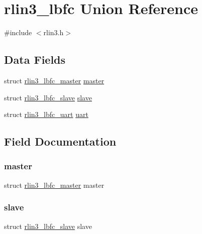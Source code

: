 \hypertarget{unionrlin3__lbfc}{}\section{rlin3\+\_\+lbfc Union Reference}
\label{unionrlin3__lbfc}


{\ttfamily \#include $<$rlin3.\+h$>$}

\subsection*{Data Fields}
\begin{DoxyCompactItemize}
\item 
struct \mbox{\hyperlink{structrlin3__lbfc__master}{rlin3\+\_\+lbfc\+\_\+master}} \mbox{\hyperlink{unionrlin3__lbfc_a350471fb0608bb7e538d001cd3d2c72a}{master}}
\item 
struct \mbox{\hyperlink{structrlin3__lbfc__slave}{rlin3\+\_\+lbfc\+\_\+slave}} \mbox{\hyperlink{unionrlin3__lbfc_a7c6a5e576b568ed606b3997db6e898f5}{slave}}
\item 
struct \mbox{\hyperlink{structrlin3__lbfc__uart}{rlin3\+\_\+lbfc\+\_\+uart}} \mbox{\hyperlink{unionrlin3__lbfc_aded53e20b3095d4feec0e4ed6378fd91}{uart}}
\end{DoxyCompactItemize}


\subsection{Field Documentation}
\mbox{\label{unionrlin3__lbfc_a350471fb0608bb7e538d001cd3d2c72a}} 
\subsubsection{\texorpdfstring{master}{master}}
{\footnotesize\ttfamily struct \mbox{\hyperlink{structrlin3__lbfc__master}{rlin3\+\_\+lbfc\+\_\+master}} master}

\mbox{\label{unionrlin3__lbfc_a7c6a5e576b568ed606b3997db6e898f5}} 
\subsubsection{\texorpdfstring{slave}{slave}}
{\footnotesize\ttfamily struct \mbox{\hyperlink{structrlin3__lbfc__slave}{rlin3\+\_\+lbfc\+\_\+slave}} slave}


